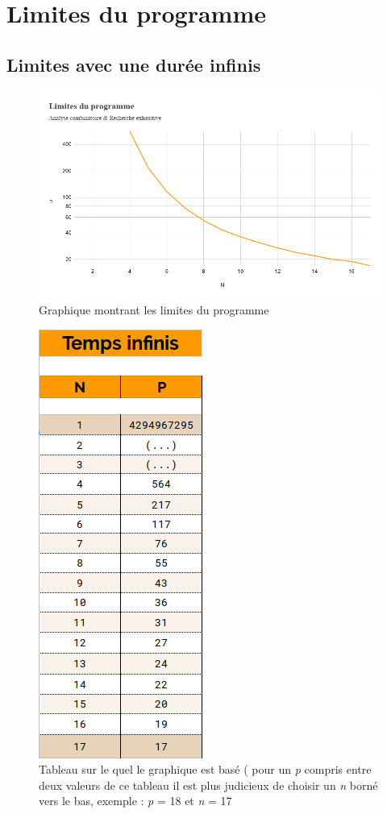 \documentclass[a4paper, 11pt, oneside]{article}
\begin{document}
\newpage
\section{Limites du programme}
\subsection{Limites avec une durée infinis
}

\begin{figure}[!h]
			\centering
\includegraphics[scale=0.35]{Limites.png}
			\caption{Graphique montrant les limites du programme}
		\end{figure}

\begin{figure}
\includegraphics[scale=0.5]{stats1.png}
\caption{Tableau sur le quel le graphique est basé ( pour un \textit{p} compris entre deux valeurs de ce tableau il est plus judicieux de choisir un \textit{n} borné vers le bas, exemple : \textit{p} = 18 et \textit{n} = 17}
\label{Tableau}
\end{figure}
\end{document}
